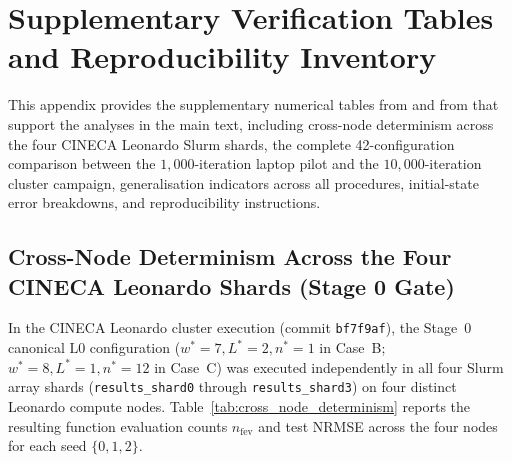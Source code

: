 \appendix
\section{Supplementary Verification Tables and Reproducibility Inventory}
\label{sec:appendix}

This appendix provides the supplementary numerical tables from  and from  that support the analyses in the main text, including cross-node determinism across the four CINECA Leonardo Slurm shards, the complete 42-configuration comparison between the $1{,}000$-iteration laptop pilot and the $10{,}000$-iteration cluster campaign, generalisation indicators across all procedures, initial-state error breakdowns, and reproducibility instructions.

\subsection{Cross-Node Determinism Across the Four CINECA Leonardo Shards (Stage 0 Gate)}

In the CINECA Leonardo cluster execution (commit \texttt{bf7f9af}), the Stage~0 canonical $\mathrm{L0}$ configuration ($w^*=7, L^*=2, n^*=1$ in Case~B; $w^*=8, L^*=1, n^*=12$ in Case~C) was executed independently in all four Slurm array shards (\texttt{results\_shard0} through \texttt{results\_shard3}) on four distinct Leonardo compute nodes. Table~\ref{tab:cross_node_determinism} reports the resulting function evaluation counts $n_{\mathrm{fev}}$ and test NRMSE across the four nodes for each seed $\{0,1,2\}$.

